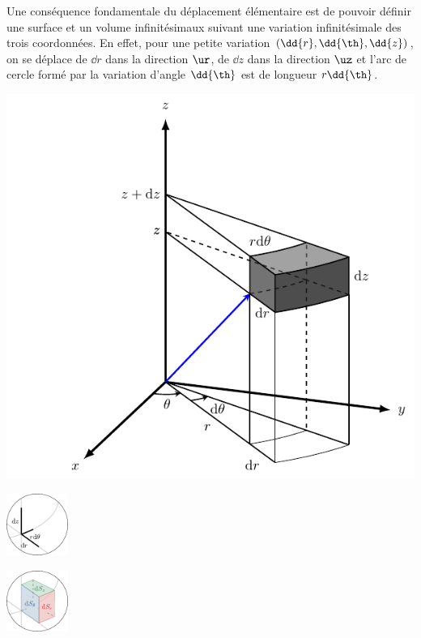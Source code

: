 \documentclass[../../main/main.tex]{subfiles}
\begin{document}
\noindent
\begin{minipage}{0.48\linewidth}
	Une conséquence fondamentale du déplacement élémentaire est de pouvoir définir
	une surface et un volume infinitésimaux suivant une variation infinitésimale
	des trois coordonnées.
	\smallbreak
	En effet, pour une petite variation $(\dd{r}, \dd{\th}, \dd{z})$,
	on se déplace de $\dd{r}$ dans la direction $\ur$, de $\dd{z}$ dans la
	direction $\uz$ et l'arc de cercle formé par la variation d'angle $\dd{\th}$
	est de longueur $r\dd{\th}$.
\end{minipage}
\hfill
\begin{minipage}{0.25\linewidth}
	\begin{center}
		\includegraphics[width=\linewidth]{cyl_vol}
		\captionsetup{justification=centering}
	\end{center}
\end{minipage}
\begin{minipage}{0.25\linewidth}
	\begin{center}
		\includegraphics[height=2cm]{zoom_cyl_lgn}
	\end{center}
	\begin{center}
		\includegraphics[height=2cm]{zoom_cyl_sfc}
		\captionsetup{justification=centering}
	\end{center}
\end{minipage}
\end{document}

